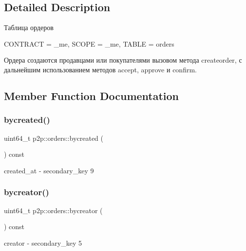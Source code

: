 \subsection{Detailed Description}
Таблица ордеров 

C\+O\+N\+T\+R\+A\+CT = \+\_\+me, S\+C\+O\+PE = \+\_\+me, T\+A\+B\+LE = orders

Ордера создаются продавцами или покупателями вызовом метода createorder, с дальнейшим использованием методов accept, approve и confirm. 

\subsection{Member Function Documentation}
\mbox{\label{structp2p_1_1orders_a6eab9cb4d0f7b605aef8856aad730fe5}} 
\subsubsection{\texorpdfstring{bycreated()}{bycreated()}}
{\footnotesize\ttfamily uint64\+\_\+t p2p\+::orders\+::bycreated (\begin{DoxyParamCaption}{ }\end{DoxyParamCaption}) const\hspace{0.3cm}{\ttfamily [inline]}}

created\+\_\+at -\/ secondary\+\_\+key 9 \mbox{\label{structp2p_1_1orders_a91b49c417f79ef405982bfe348651a98}} 
\subsubsection{\texorpdfstring{bycreator()}{bycreator()}}
{\footnotesize\ttfamily uint64\+\_\+t p2p\+::orders\+::bycreator (\begin{DoxyParamCaption}{ }\end{DoxyParamCaption}) const\hspace{0.3cm}{\ttfamily [inline]}}

creator -\/ secondary\+\_\+key 5 \mbox{\label{structp2p_1_1orders_a76fa8b54f391ccd2e29b640d4c0199df}} 
